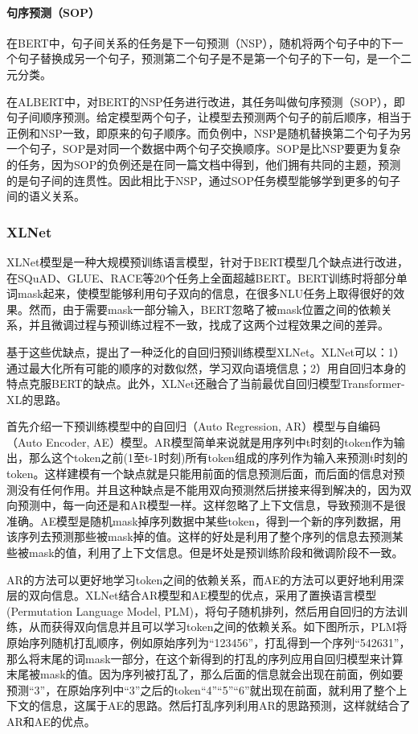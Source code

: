 \paragraph{句序预测（SOP）}
在BERT中，句子间关系的任务是下一句预测（NSP），随机将两个句子中的下一个句子替换成另一个句子，预测第二个句子是不是第一个句子的下一句，是一个二元分类。

在ALBERT中，对BERT的NSP任务进行改进，其任务叫做句序预测（SOP），即句子间顺序预测。给定模型两个句子，让模型去预测两个句子的前后顺序，相当于正例和NSP一致，即原来的句子顺序。而负例中，NSP是随机替换第二个句子为另一个句子，SOP是对同一个数据中两个句子交换顺序。SOP是比NSP要更为复杂的任务，因为SOP的负例还是在同一篇文档中得到，他们拥有共同的主题，预测的是句子间的连贯性。因此相比于NSP，通过SOP任务模型能够学到更多的句子间的语义关系。

\subsubsection{XLNet}
XLNet模型是一种大规模预训练语言模型，针对于BERT模型几个缺点进行改进，在SQuAD、GLUE、RACE等20个任务上全面超越BERT。BERT训练时将部分单词mask起来，使模型能够利用句子双向的信息，在很多NLU任务上取得很好的效果。然而，由于需要mask一部分输入，BERT忽略了被mask位置之间的依赖关系，并且微调过程与预训练过程不一致，找成了这两个过程效果之间的差异。

基于这些优缺点，提出了一种泛化的自回归预训练模型XLNet。XLNet可以：1）通过最大化所有可能的顺序的对数似然，学习双向语境信息；2）用自回归本身的特点克服BERT的缺点。此外，XLNet还融合了当前最优自回归模型Transformer-XL的思路。

首先介绍一下预训练模型中的自回归（Auto Regression, AR）模型与自编码（Auto Encoder, AE）模型。AR模型简单来说就是用序列中t时刻的token作为输出，那么这个token之前(1至t-1时刻)所有token组成的序列作为输入来预测t时刻的token。这样建模有一个缺点就是只能用前面的信息预测后面，而后面的信息对预测没有任何作用。并且这种缺点是不能用双向预测然后拼接来得到解决的，因为双向预测中，每一向还是和AR模型一样。这样忽略了上下文信息，导致预测不是很准确。AE模型是随机mask掉序列数据中某些token，得到一个新的序列数据，用该序列去预测那些被mask掉的值。这样的好处是利用了整个序列的信息去预测某些被mask的值，利用了上下文信息。但是坏处是预训练阶段和微调阶段不一致。

AR的方法可以更好地学习token之间的依赖关系，而AE的方法可以更好地利用深层的双向信息。XLNet结合AR模型和AE模型的优点，采用了置换语言模型 (Permutation Language Model, PLM)，将句子随机排列，然后用自回归的方法训练，从而获得双向信息并且可以学习token之间的依赖关系。如下图所示，PLM将原始序列随机打乱顺序，例如原始序列为“123456”，打乱得到一个序列“542631”，那么将末尾的词mask一部分，在这个新得到的打乱的序列应用自回归模型来计算末尾被mask的值。因为序列被打乱了，那么后面的信息就会出现在前面，例如要预测“3”，在原始序列中“3”之后的token“4”“5”“6”就出现在前面，就利用了整个上下文的信息，这属于AE的思路。然后打乱序列利用AR的思路预测，这样就结合了AR和AE的优点。

